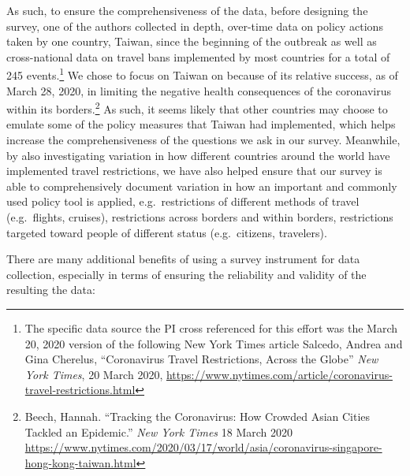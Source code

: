\documentclass[]{article}
\let\rmarkdownfootnote\footnote%
\def\footnote{\protect\rmarkdownfootnote}
\begin{document}
As such, to ensure the comprehensiveness of the data, before designing the survey, one of the authors collected in depth, over-time data on policy actions taken by one country, Taiwan, since the beginning of the outbreak as well as cross-national data on travel bans implemented by most countries for a total of 245 events.\footnote{The specific data source the PI cross referenced for this effort was the March 20, 2020 version of the following New York Times article Salcedo, Andrea and Gina Cherelus, ``Coronavirus Travel Restrictions, Across the Globe'' \emph{New York Times}, 20 March 2020, \url{https://www.nytimes.com/article/coronavirus-travel-restrictions.html}} We chose to focus on Taiwan on because of its relative success, as of March 28, 2020, in limiting the negative health consequences of the coronavirus within its borders.\footnote{Beech, Hannah. ``Tracking the Coronavirus: How Crowded Asian Cities Tackled an Epidemic.'' \emph{New York Times} 18 March 2020 \url{https://www.nytimes.com/2020/03/17/world/asia/coronavirus-singapore-hong-kong-taiwan.html}} As such, it seems likely that other countries may choose to emulate some of the policy measures that Taiwan had implemented, which helps increase the comprehensiveness of the questions we ask in our survey. Meanwhile, by also investigating variation in how different countries around the world have implemented travel restrictions, we have also helped ensure that our survey is able to comprehensively document variation in how an important and commonly used policy tool is applied, e.g.~restrictions of different methods of travel (e.g.~flights, cruises), restrictions across borders and within borders, restrictions targeted toward people of different status (e.g.~citizens, travelers).

There are many additional benefits of using a survey instrument for data collection, especially in terms of ensuring the reliability and validity of the resulting the data:
\end{document}
